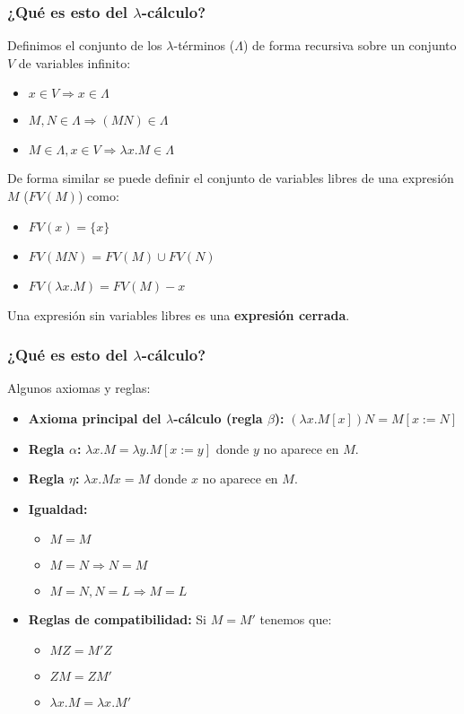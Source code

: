 \documentclass[spanish, a4paper, 12pt, final, slideColor, nototal, colorBG, pdf, noaccumulate, darkblue] {beamer}
\begin{document}
\begin{frame}
    \frametitle{¿Qué es esto del $\lambda$-cálculo?}
    Definimos el conjunto de los $\lambda$-términos ($\Lambda$) de forma recursiva sobre un conjunto $V$ de variables infinito:
    \begin{itemize}
        \item $x \in V \Rightarrow x \in \Lambda$
        \item $M, N \in \Lambda \Rightarrow (MN)\in \Lambda$
        \item $M \in \Lambda, x \in V \Rightarrow \lambda x.M \in \Lambda$
    \end{itemize}
    De forma similar se puede definir el conjunto de variables libres de una expresión $M$ ($FV(M)$) como:
    \begin{itemize}
        \item $FV(x) = \{x\}$
        \item $FV(MN) = FV(M) \cup FV(N)$
        \item $FV(\lambda x.M) = FV(M) - {x}$
    \end{itemize}%
    Una expresión sin variables libres es una \textbf{expresión cerrada}.
\end{frame}
\begin{frame}
    \frametitle{¿Qué es esto del $\lambda$-cálculo?}
    Algunos axiomas y reglas:
    \begin{itemize}
        \item \textbf{Axioma principal del $\lambda$-cálculo (regla $\beta$): }$(\lambda x.M[x])N = M[x := N]$
        \item \textbf{Regla $\alpha$: }$\lambda x.M = \lambda y.M[x := y]$ donde $y$ no aparece en $M$.
        \item \textbf{Regla $\eta$: }$\lambda x.Mx = M$ donde $x$ no aparece en $M$.
        \item \textbf{Igualdad: }
        \begin{itemize}
            \item $M = M$
            \item $M = N \Rightarrow N = M$
            \item $M = N, N = L \Rightarrow M = L$
        \end{itemize}
        \item \textbf{Reglas de compatibilidad: } Si $M = M'$ tenemos que:
        \begin{itemize}
            \item $MZ = M'Z$
            \item $ZM = ZM'$
            \item $\lambda x.M = \lambda x.M'$
        \end{itemize}
    \end{itemize}
\end{frame}
\end{document}
